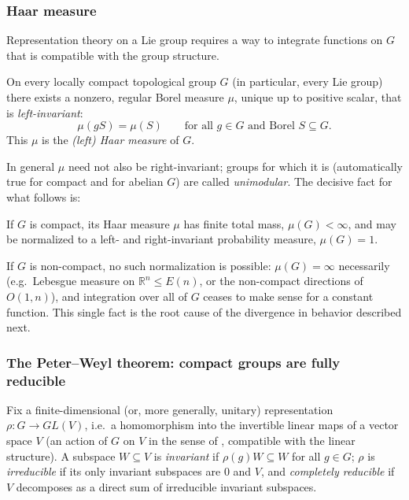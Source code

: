 \documentclass[mathematics,review,submit,moreauthors]{Definitions/mdpi}
\begin{document}
\subsubsection{Haar measure}
\label{subsubsec:haar-measure}

Representation theory on a Lie group requires a way to integrate functions
on $G$ that is compatible with the group structure.

\begin{Theorem}
\label{thm:haar-measure}
On every locally compact topological group $G$ (in particular, every Lie
group) there exists a nonzero, regular Borel measure $\mu$, unique up to
positive scalar, that is \emph{left-invariant}:
\[
    \mu(gS) = \mu(S) \qquad \text{for all } g \in G \text{ and Borel } S \subseteq G.
\]
This $\mu$ is the \emph{(left) Haar measure} of $G$.
\end{Theorem}

In general $\mu$ need not also be right-invariant; groups for which it is
(automatically true for compact and for abelian $G$) are called
\emph{unimodular}. The decisive fact for what follows is:

\begin{Proposition}
\label{prop:compact-haar-finite}
If $G$ is compact, its Haar measure $\mu$ has finite total mass,
$\mu(G) < \infty$, and may be normalized to a left- and right-invariant
probability measure, $\mu(G) = 1$.
\end{Proposition}

If $G$ is non-compact, no such normalization is possible: $\mu(G) = \infty$
necessarily (e.g.\ Lebesgue measure on $\mathbb{R}^n \leq E(n)$, or the
non-compact directions of $O(1,n)$), and integration over all of $G$ ceases
to make sense for a constant function. This single fact is the root cause of
the divergence in behavior described next.

\subsubsection{The Peter--Weyl theorem: compact groups are fully reducible}
\label{subsubsec:peter-weyl}

Fix a finite-dimensional (or, more generally, unitary) representation
$\rho : G \to GL(V)$, i.e.\ a homomorphism into the invertible linear maps of
a vector space $V$ (an action of $G$ on $V$ in the sense of
, compatible with the linear structure). A
subspace $W \subseteq V$ is \emph{invariant} if $\rho(g)W \subseteq W$ for
all $g \in G$; $\rho$ is \emph{irreducible} if its only invariant subspaces
are $0$ and $V$, and \emph{completely reducible} if $V$ decomposes as a
direct sum of irreducible invariant subspaces.
\end{document}
